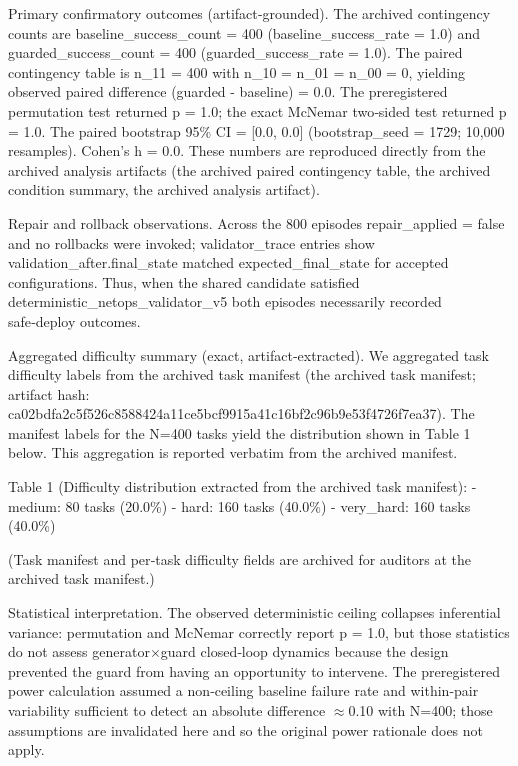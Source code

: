 \documentclass[conference]{IEEEtran}
\begin{document}
Primary confirmatory outcomes (artifact‑grounded). The archived contingency counts are baseline\_success\_count = 400 (baseline\_success\_rate = 1.0) and guarded\_success\_count = 400 (guarded\_success\_rate = 1.0). The paired contingency table is n\_11 = 400 with n\_10 = n\_01 = n\_00 = 0, yielding observed paired difference (guarded - baseline) = 0.0. The preregistered permutation test returned p = 1.0; the exact McNemar two‑sided test returned p = 1.0. The paired bootstrap 95\% CI = [0.0, 0.0] (bootstrap\_seed = 1729; 10,000 resamples). Cohen's h = 0.0. These numbers are reproduced directly from the archived analysis artifacts (the archived paired contingency table, the archived condition summary, the archived analysis artifact).

Repair and rollback observations. Across the 800 episodes repair\_applied = false and no rollbacks were invoked; validator\_trace entries show validation\_after.final\_state matched expected\_final\_state for accepted configurations. Thus, when the shared candidate satisfied deterministic\_netops\_validator\_v5 both episodes necessarily recorded safe‑deploy outcomes.

Aggregated difficulty summary (exact, artifact‑extracted). We aggregated task difficulty labels from the archived task manifest (the archived task manifest; artifact hash: ca02bdfa\allowbreak{}2c5f526c\allowbreak{}8588424a\allowbreak{}11ce5bcf\allowbreak{}9915a41c\allowbreak{}16bf2c96\allowbreak{}b9e53f47\allowbreak{}26f7ea37). The manifest labels for the N=400 tasks yield the distribution shown in Table 1 below. This aggregation is reported verbatim from the archived manifest.

Table 1 (Difficulty distribution extracted from the archived task manifest):
- medium: 80 tasks (20.0\%)
- hard: 160 tasks (40.0\%)
- very\_hard: 160 tasks (40.0\%)

(Task manifest and per‑task difficulty fields are archived for auditors at the archived task manifest.)

Statistical interpretation. The observed deterministic ceiling collapses inferential variance: permutation and McNemar correctly report p = 1.0, but those statistics do not assess generator\ensuremath{\times}guard closed‑loop dynamics because the design prevented the guard from having an opportunity to intervene. The preregistered power calculation assumed a non‑ceiling baseline failure rate and within‑pair variability sufficient to detect an absolute difference \ensuremath{\approx}0.10 with N=400; those assumptions are invalidated here and so the original power rationale does not apply.
\end{document}
